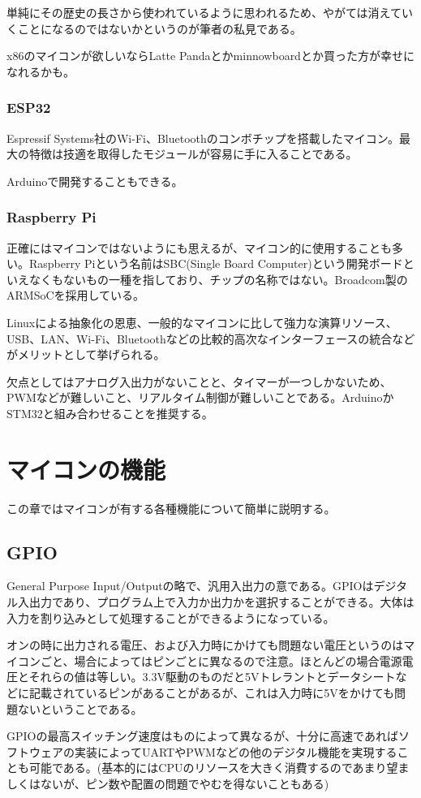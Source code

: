 \documentclass[a4paper,titlepage,here]{ujarticle}
\begin{document}
単純にその歴史の長さから使われているように思われるため、やがては消えていくことになるのではないかというのが筆者の私見である。

x86のマイコンが欲しいならLatte Pandaとかminnowboardとか買った方が幸せになれるかも。
\subsubsection{ESP32}
Espressif Systems社のWi-Fi、Bluetoothのコンボチップを搭載したマイコン。最大の特徴は技適を取得したモジュールが容易に手に入ることである。

Arduinoで開発することもできる。
\subsubsection{Raspberry Pi}
正確にはマイコンではないようにも思えるが、マイコン的に使用することも多い。Raspberry Piという名前はSBC(Single Board Computer)という開発ボードといえなくもないもの一種を指しており、チップの名称ではない。Broadcom製のARMSoCを採用している。

Linuxによる抽象化の恩恵、一般的なマイコンに比して強力な演算リソース、USB、LAN、Wi-Fi、Bluetoothなどの比較的高次なインターフェースの統合などがメリットとして挙げられる。

欠点としてはアナログ入出力がないことと、タイマーが一つしかないため、PWMなどが難しいこと、リアルタイム制御が難しいことである。ArduinoかSTM32と組み合わせることを推奨する。
\section{マイコンの機能}
この章ではマイコンが有する各種機能について簡単に説明する。
\subsection{GPIO}
General Purpose Input/Outputの略で、汎用入出力の意である。GPIOはデジタル入出力であり、プログラム上で入力か出力かを選択することができる。大体は入力を割り込みとして処理することができるようになっている。

オンの時に出力される電圧、および入力時にかけても問題ない電圧というのはマイコンごと、場合によってはピンごとに異なるので注意。ほとんどの場合電源電圧とそれらの値は等しい。3.3V駆動のものだと5Vトレラントとデータシートなどに記載されているピンがあることがあるが、これは入力時に5Vをかけても問題ないということである。

GPIOの最高スイッチング速度はものによって異なるが、十分に高速であればソフトウェアの実装によってUARTやPWMなどの他のデジタル機能を実現することも可能である。(基本的にはCPUのリソースを大きく消費するのであまり望ましくはないが、ピン数や配置の問題でやむを得ないこともある)
\end{document}
